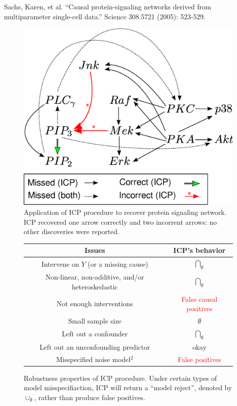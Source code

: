 \documentclass[12pt]{article}
\begin{document}
Sachs, Karen, et al. ``Causal protein-signaling networks derived from
multiparameter single-cell data.'' Science 308.5721 (2005): 523-529.

\begin{figure}[h]
\centering
\includegraphics[scale = 0.3]{drawing2legend.eps}
\caption{Application of ICP procedure to recover protein signaling network.
ICP recovered one arrow correctly and two incorrent arrows: no other discoveries were reported.}
\end{figure}

\begin{figure}[h]
\centering
  \begin{tabular}{|c|c|}
    \hline
    \textbf{Issues} & \textbf{ICP's behavior} \\
    \hline
    Intervene on $Y$ (or a missing cause) &
    $\underset{\emptyset}{\bigcap}$ \\
    \hline
    Non-linear, non-additive, and/or heteroskedastic &
    $\underset{\emptyset}{\bigcap}$ \\
    \hline
    Not enough interventions &
    \textcolor{red}{False causal positives} \\
    \hline
    Small sample size &
    $\emptyset$ \\
    \hline
    Left out a confounder & $\underset{\emptyset}{\bigcap}$ \\
    \hline
    Left out an unconfounding predictor & okay  \\
    \hline
    Misspecified noise model$^2$ & \textcolor{red}{False positives}\\\hline
  \end{tabular}
\caption{Robustness properties of ICP procedure.  Under certain types of model misspecifiaction,
ICP will return a ``model reject'', denoted by $\cup_{\emptyset}$, rather than produce false positives.}
\end{figure}
\end{document}
